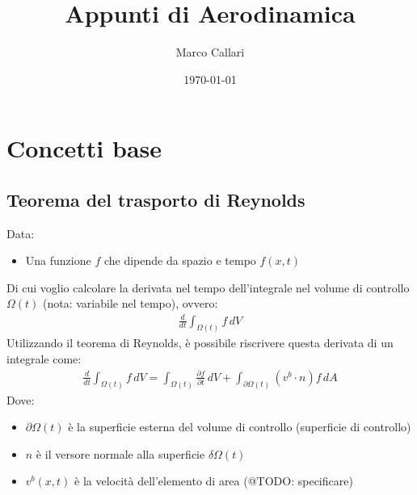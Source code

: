 \documentclass[11pt]{article}
\author{Marco Callari}
\date{\today}
\title{Appunti di Aerodinamica}
\begin{document}
\maketitle
\tableofcontents


\section{Concetti base}
\label{sec:org8350f1a}
\subsection{Teorema del trasporto di Reynolds}
\label{sec:org0c62930}
Data:
\begin{itemize}
\item Una funzione \(f\) che dipende da spazio e tempo \(f(x,t)\)
\end{itemize}
Di cui voglio calcolare la derivata nel tempo dell'integrale nel volume di controllo \(\Omega(t)\) (nota: variabile nel tempo), ovvero:
\begin{gather*}
\frac{d}{dt} \int_{\Omega(t)} f \,dV
\end{gather*}
Utilizzando il teorema di Reynolds, è possibile riscrivere questa derivata di un integrale come:
\begin{gather*}
\frac{d}{dt} \int_{\Omega(t)} f \,dV = \int_{\Omega(t)}{\frac{\partial f}{\partial t}\,dV} + \int_{\partial\Omega(t)}{(v^b \cdot n)f\,dA}
\end{gather*}
Dove:
\begin{itemize}
\item \(\partial \Omega(t)\) è la superficie esterna del volume di controllo (superficie di controllo)
\item \(n\) è il versore normale alla superficie \(\delta \Omega(t)\)
\item \(v^b(x,t)\) è la velocità dell'elemento di area (@TODO: specificare)
\end{itemize}
\end{document}

